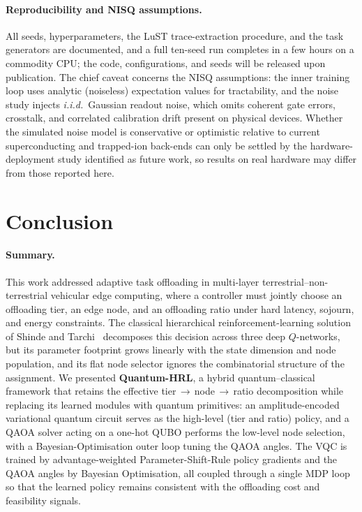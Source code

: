 \documentclass[11pt,a4paper]{article}
\theoremstyle{definition}
\begin{document}
\paragraph{Reproducibility and NISQ assumptions.}
All seeds, hyperparameters, the LuST trace-extraction procedure, and the task generators are documented, and a full ten-seed run completes in a few hours on a commodity CPU; the code, configurations, and seeds will be released upon publication. The chief caveat concerns the NISQ assumptions: the inner training loop uses analytic (noiseless) expectation values for tractability, and the noise study injects \emph{i.i.d.}\ Gaussian readout noise, which omits coherent gate errors, crosstalk, and correlated calibration drift present on physical devices. Whether the simulated noise model is conservative or optimistic relative to current superconducting and trapped-ion back-ends can only be settled by the hardware-deployment study identified as future work, so results on real hardware may differ from those reported here.

\section{Conclusion}
\label{sec:conclusion}

\paragraph{Summary.}
This work addressed adaptive task offloading in multi-layer terrestrial--non-terrestrial vehicular edge computing, where a controller must jointly choose an offloading tier, an edge node, and an offloading ratio under hard latency, sojourn, and energy constraints. The classical hierarchical reinforcement-learning solution of Shinde and Tarchi~\cite{hrl_ntn} decomposes this decision across three deep $Q$-networks, but its parameter footprint grows linearly with the state dimension and node population, and its flat node selector ignores the combinatorial structure of the assignment. We presented \textbf{Quantum-HRL}, a hybrid quantum--classical framework that retains the effective tier\,$\to$\,node\,$\to$\,ratio decomposition while replacing its learned modules with quantum primitives: an amplitude-encoded variational quantum circuit serves as the high-level (tier and ratio) policy, and a QAOA solver acting on a one-hot QUBO performs the low-level node selection, with a Bayesian-Optimisation outer loop tuning the QAOA angles. The VQC is trained by advantage-weighted Parameter-Shift-Rule policy gradients and the QAOA angles by Bayesian Optimisation, all coupled through a single MDP loop so that the learned policy remains consistent with the offloading cost and feasibility signals.
\end{document}

